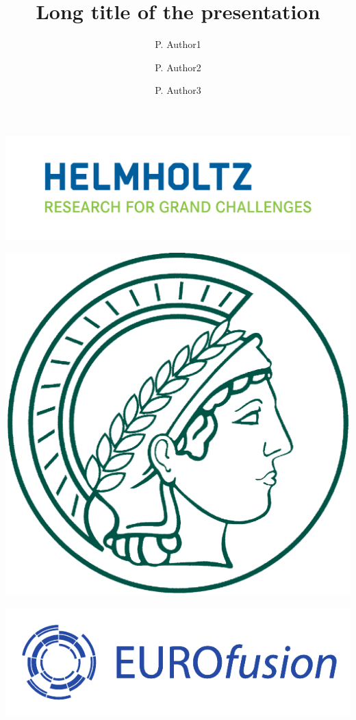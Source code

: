 \documentclass{beamer}
\begin{document}

\title[Short presentation title]{Long title of the presentation}

\author[lecturer, maybe place and date]{P. Author1 \and
  P. Author2 \and P. Author3}


\date{ }

% 
\begin{frame}
  \titlepage

  \begin{minipage}[]{0.35\textwidth}
			\includegraphics[height=6ex]{2017_H_Logo_CMYK_untereinander_EN}
	\end{minipage}
				\hfill
  \begin{minipage}[]{0.2\textwidth}
	  \begin{center}
			\includegraphics[height=4ex]{minerva}
	  \end{center}
	\end{minipage}
				\hfill
  \begin{minipage}[]{0.35\textwidth}
			\begin{flushright}
			\includegraphics[height=5ex]{EUROfusion-LOGO-PANTONE_REFL_BLUE}
			\end{flushright}
	\end{minipage}
	
  \acknowledgement
\end{frame}
\end{document}

